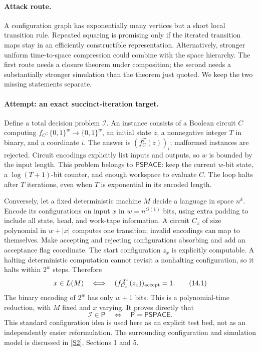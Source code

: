 \documentclass[11pt,a4paper]{article}
\newcommand{\sref}[2]{\hyperlink{source:#1:#2}{[S#2]}}
\begin{document}
\paragraph{Attack route.}
A configuration graph has exponentially many vertices but a short local
transition rule. Repeated squaring is promising only if the iterated
transition maps stay in an efficiently constructible representation.
Alternatively, stronger uniform time-to-space compression could combine
with the space hierarchy. The first route needs a closure theorem under
composition; the second needs a substantially stronger simulation than
the theorem just quoted. We keep the two missing statements separate.

\paragraph{Attempt: an exact succinct-iteration target.}
Define a total decision problem $\mathcal I$. An instance consists of a
Boolean circuit $C$ computing $f_C:\{0,1\}^w\to\{0,1\}^w$, an initial
state $z$, a nonnegative integer $T$ in binary, and a coordinate $i$.
The answer is $(f_C^T(z))_i$; malformed instances are rejected. Circuit
encodings explicitly list inputs and outputs, so $w$ is bounded by the
input length. This problem belongs to $\mathsf{PSPACE}$: keep the current
$w$-bit state, a $\log(T+1)$-bit counter, and enough workspace to evaluate
$C$. The loop halts after $T$ iterations, even when $T$ is exponential
in its encoded length.

Conversely, let a fixed deterministic machine $M$ decide a language in
space $n^k$. Encode its configurations on input $x$ in $w=n^{O(1)}$
bits, using extra padding to include all state, head, and work-tape
information. A circuit $C_x$ of size polynomial in $w+|x|$ computes one
transition; invalid encodings can map to themselves. Make accepting and
rejecting configurations absorbing and add an acceptance flag coordinate.
The start configuration $z_x$ is explicitly computable. A halting
deterministic computation cannot revisit a nonhalting configuration, so
it halts within $2^w$ steps. Therefore
\[
 x\in L(M)\quad\Longleftrightarrow\quad
 (f_{C_x}^{\,2^w}(z_x))_{\rm accept}=1. \tag{14.1}
\]
The binary encoding of $2^w$ has only $w+1$ bits. This is a polynomial-time
reduction, with $M$ fixed and $x$ varying. It proves directly that
\[
 \mathcal I\in\mathsf P\quad\Longleftrightarrow\quad
 \mathsf P=\mathsf{PSPACE}. \tag{14.2}
\]
This standard configuration idea is used here as an explicit test bed,
not as an independently easier reformulation. The surrounding
configuration and simulation model is discussed in \sref{statement}{2},
Sections 1 and 5.
\end{document}
